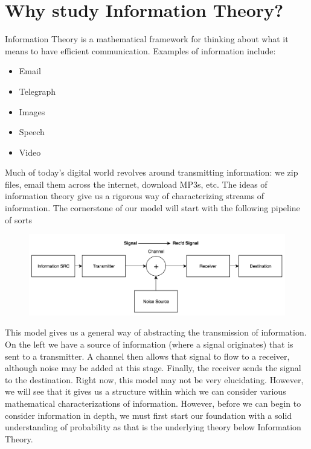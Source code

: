 \documentclass[13pt,oneside]{tufte-book}
\providecommand{\tightlist}{%
  \setlength{\itemsep}{0pt}\setlength{\parskip}{0pt}}
\theoremstyle{definition}
\theoremstyle{definition}
\theoremstyle{definition}
\theoremstyle{remark}
\begin{document}
\section{Why study Information
Theory?}\label{why-study-information-theory}

Information Theory is a mathematical framework for thinking about what
it means to have efficient communication. Examples of information
include:

\begin{itemize}
\tightlist
\item
  Email
\item
  Telegraph
\item
  Images
\item
  Speech
\item
  Video
\end{itemize}

Much of today's digital world revolves around transmitting information:
we zip files, email them across the internet, download MP3s, etc. The
ideas of information theory give us a rigorous way of characterizing
streams of information. The cornerstone of our model will start with the
following pipeline of sorts

\begin{figure}
\centering
\includegraphics{pipeline.png}
\caption{}
\end{figure}

This model gives us a general way of abstracting the transmission of
information. On the left we have a source of information (where a signal
originates) that is sent to a transmitter. A channel then allows that
signal to flow to a receiver, although noise may be added at this stage.
Finally, the receiver sends the signal to the destination. Right now,
this model may not be very elucidating. However, we will see that it
gives us a structure within which we can consider various mathematical
characterizations of information. However, before we can begin to
consider information in depth, we must first start our foundation with a
solid understanding of probability as that is the underlying theory
below Information Theory.
\end{document}
